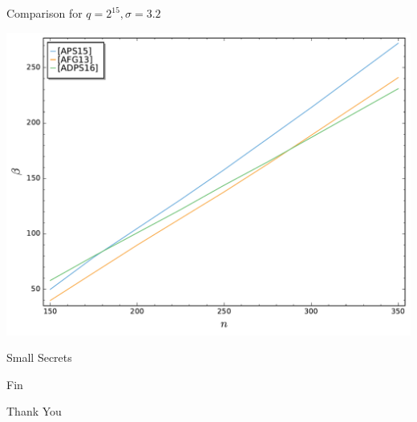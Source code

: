 \documentclass[presentation,smaller]{beamer}
\begin{document}
\begin{frame}[label={sec:orgb8a498c}]{Comparison for \(q=2^{15}, σ=3.2\)}
\begin{center}
\includegraphics[width=.9\linewidth]{./usvp-comparison.pdf}
\end{center}
\end{frame}

\begin{frame}[label={sec:orgfc487f8}]{Small Secrets}
\end{frame}

\begin{frame}[standout,label={sec:org1e98f60}]{Fin}
\begin{center}
\Huge \alert{Thank You}
\end{center}
\end{frame}
\end{document}
